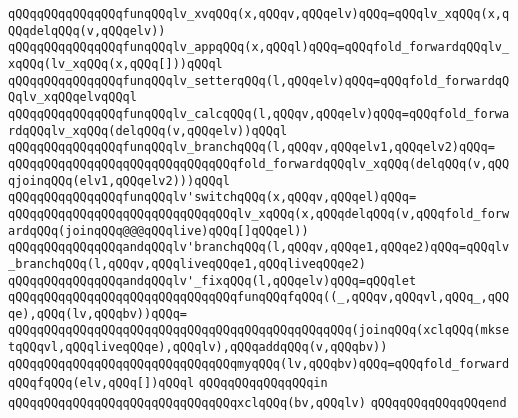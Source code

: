 \newline
\verb|qQQqqQQqqQQqqQQqfunqQQqlv_xvqQQq(x,qQQqv,qQQqelv)qQQq=qQQqlv_xqQQq(x,qQQqdelqQQq(v,qQQqelv))|\newline
\newline
\verb|qQQqqQQqqQQqqQQqfunqQQqlv_appqQQq(x,qQQql)qQQq=qQQqfold_forwardqQQqlv_xqQQq(lv_xqQQq(x,qQQq[]))qQQql|\newline
\newline
\verb|qQQqqQQqqQQqqQQqfunqQQqlv_setterqQQq(l,qQQqelv)qQQq=qQQqfold_forwardqQQqlv_xqQQqelvqQQql|\newline
\newline
\verb|qQQqqQQqqQQqqQQqfunqQQqlv_calcqQQq(l,qQQqv,qQQqelv)qQQq=qQQqfold_forwardqQQqlv_xqQQq(delqQQq(v,qQQqelv))qQQql|\newline
\newline
\verb|qQQqqQQqqQQqqQQqfunqQQqlv_branchqQQq(l,qQQqv,qQQqelv1,qQQqelv2)qQQq=|\newline
\verb|qQQqqQQqqQQqqQQqqQQqqQQqqQQqqQQqfold_forwardqQQqlv_xqQQq(delqQQq(v,qQQqjoinqQQq(elv1,qQQqelv2)))qQQql|\newline
\newline
\verb|qQQqqQQqqQQqqQQqfunqQQqlv'switchqQQq(x,qQQqv,qQQqel)qQQq=|\newline
\verb|qQQqqQQqqQQqqQQqqQQqqQQqqQQqqQQqlv_xqQQq(x,qQQqdelqQQq(v,qQQqfold_forwardqQQq(joinqQQq@@@qQQqlive)qQQq[]qQQqel))|\newline
\newline
\verb|qQQqqQQqqQQqqQQqandqQQqlv'branchqQQq(l,qQQqv,qQQqe1,qQQqe2)qQQq=qQQqlv_branchqQQq(l,qQQqv,qQQqliveqQQqe1,qQQqliveqQQqe2)|\newline
\newline
\verb|qQQqqQQqqQQqqQQqandqQQqlv'_fixqQQq(l,qQQqelv)qQQq=qQQqlet|\newline
\verb|qQQqqQQqqQQqqQQqqQQqqQQqqQQqqQQqfunqQQqfqQQq((_,qQQqv,qQQqvl,qQQq_,qQQqe),qQQq(lv,qQQqbv))qQQq=|\newline
\verb|qQQqqQQqqQQqqQQqqQQqqQQqqQQqqQQqqQQqqQQqqQQqqQQq(joinqQQq(xclqQQq(mksetqQQqvl,qQQqliveqQQqe),qQQqlv),qQQqaddqQQq(v,qQQqbv))|\newline
\verb|qQQqqQQqqQQqqQQqqQQqqQQqqQQqqQQqmyqQQq(lv,qQQqbv)qQQq=qQQqfold_forwardqQQqfqQQq(elv,qQQq[])qQQql|\newline
\verb|qQQqqQQqqQQqqQQqin|\newline
\verb|qQQqqQQqqQQqqQQqqQQqqQQqqQQqqQQqxclqQQq(bv,qQQqlv)|\newline
\verb|qQQqqQQqqQQqqQQqend|\newline
\newline
